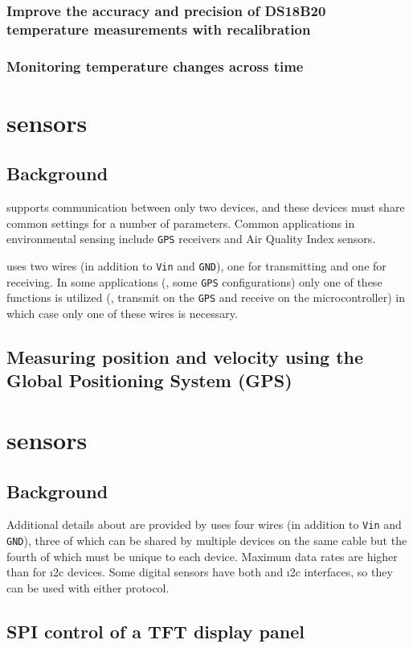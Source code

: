 \subsubsection{\color{gray} Improve the accuracy and precision of DS18B20 temperature measurements with recalibration \color{black}}
\subsubsection{\color{gray} Monitoring temperature changes across time \color{black}}


\section{\color{gray}\uart sensors \color{black}}
\subsection{\color{gray} Background \color{black}}
	\uart supports communication between only two devices, and these devices must share common settings for a number of parameters. %
Common applications in environmental sensing include \texttt{GPS} receivers and Air Quality Index sensors.

\uart uses two wires (in addition to \texttt{Vin} and \texttt{GND}), one for transmitting and one for receiving.
In some applications (\eg, some \texttt{GPS} configurations) only one of these functions is utilized (\eg, transmit on the \texttt{GPS} and receive on the microcontroller) in which case only one of these wires is necessary.
\subsection{\color{gray} Measuring position and velocity using the Global Positioning System (GPS) \color{black}}

\section{\color{gray}\spi sensors \color{black}}
\subsection{\color{gray} Background \color{black}}
	Additional details about \spi are provided by  uses four wires (in addition to \texttt{Vin} and \texttt{GND}), three of which can be shared by multiple devices on the same cable but the fourth of which must be unique to each device.
Maximum data rates are higher than for \i2c devices.
Some digital sensors have both \spi and \i2c interfaces, so they can be used with either protocol.
\subsection{\color{gray} SPI control of a TFT display panel \color{black}}


%
%
%
